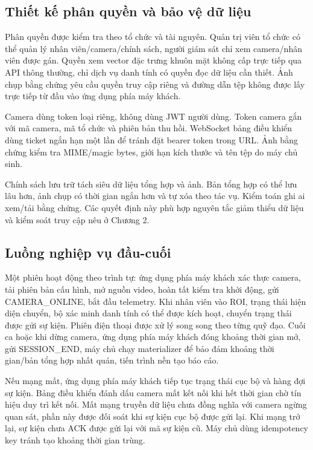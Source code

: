 \subsection{Thiết kế phân quyền và bảo vệ dữ liệu}
Phân quyền được kiểm tra theo tổ chức và tài nguyên. Quản trị viên tổ chức có thể quản lý nhân viên/camera/chính sách, người giám sát chỉ xem camera/nhân viên được gán. Quyền xem vector đặc trưng khuôn mặt không cấp trực tiếp qua API thông thường, chỉ dịch vụ danh tính có quyền đọc dữ liệu cần thiết. Ảnh chụp bằng chứng yêu cầu quyền truy cập riêng và đường dẫn tệp không được lấy trực tiếp từ đầu vào ứng dụng phía máy khách.

Camera dùng token loại riêng, không dùng JWT người dùng. Token camera gắn với mã camera, mã tổ chức và phiên bản thu hồi. WebSocket bảng điều khiển dùng ticket ngắn hạn một lần để tránh đặt bearer token trong URL. Ảnh bằng chứng kiểm tra MIME/magic bytes, giới hạn kích thước và tên tệp do máy chủ sinh.

Chính sách lưu trữ tách siêu dữ liệu tổng hợp và ảnh. Bản tổng hợp có thể lưu lâu hơn, ảnh chụp có thời gian ngắn hơn và tự xóa theo tác vụ. Kiểm toán ghi ai xem/tải bằng chứng. Các quyết định này phù hợp nguyên tắc giảm thiểu dữ liệu và kiểm soát truy cập nêu ở Chương 2.

\subsection{Luồng nghiệp vụ đầu-cuối}
Một phiên hoạt động theo trình tự: ứng dụng phía máy khách xác thực camera, tải phiên bản cấu hình, mở nguồn video, hoàn tất kiểm tra khởi động, gửi CAMERA\_ONLINE, bắt đầu telemetry. Khi nhân viên vào ROI, trạng thái hiện diện chuyển, bộ xác minh danh tính có thể được kích hoạt, chuyển trạng thái được gửi sự kiện. Phiên điện thoại được xử lý song song theo từng quỹ đạo. Cuối ca hoặc khi dừng camera, ứng dụng phía máy khách đóng khoảng thời gian mở, gửi SESSION\_END, máy chủ chạy materializer để bảo đảm khoảng thời gian/bản tổng hợp nhất quán, tiến trình nền tạo báo cáo.

Nếu mạng mất, ứng dụng phía máy khách tiếp tục trạng thái cục bộ và hàng đợi sự kiện. Bảng điều khiển đánh dấu camera mất kết nối khi hết thời gian chờ tín hiệu duy trì kết nối. Mất mạng truyền dữ liệu chưa đồng nghĩa với camera ngừng quan sát, phần này được đối soát khi sự kiện cục bộ được gửi lại. Khi mạng trở lại, sự kiện chưa ACK được gửi lại với mã sự kiện cũ. Máy chủ dùng idempotency key tránh tạo khoảng thời gian trùng.

